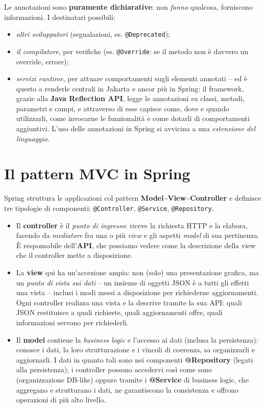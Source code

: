 \begin{importante}
Le annotazioni sono \textbf{puramente dichiarative}: non \emph{fanno} qualcosa, forniscono
informazioni. I destinatari possibili:
\begin{itemize}
  \item \emph{altri sviluppatori} (segnalazioni, es. \texttt{@Deprecated});
  \item \emph{il compilatore}, per verifiche (es. \texttt{@Override}: se il metodo non \`e
        davvero un override, errore);
  \item \emph{servizi runtime}, per attuare comportamenti sugli elementi annotati -- ed \`e
        questo a renderle centrali in Jakarta e ancor pi\`u in Spring: il framework, grazie
        alla \textbf{Java Reflection API}, legge le annotazioni su classi, metodi, parametri
        e campi, e attraverso di esse capisce come, dove e quando utilizzarli, come invocarne
        le funzionalit\`a e come dotarli di comportamenti aggiuntivi. L'uso delle annotazioni
        in Spring si avvicina a una \emph{estensione del linguaggio}.
\end{itemize}
\end{importante}

\section{Il pattern MVC in Spring}

Spring struttura le applicazioni col pattern \textbf{Model--View--Controller} e definisce tre
tipologie di componenti: \texttt{@Controller}, \texttt{@Service}, \texttt{@Repository}.
\begin{itemize}
  \item Il \textbf{controller} \`e il \emph{punto di ingresso}: riceve la richiesta HTTP e la
        elabora, facendo da \emph{mediatore} fra una o pi\`u \emph{view} e gli aspetti
        \emph{model} di sua pertinenza. \`E responsabile dell'\textbf{API}, che possiamo
        vedere come la descrizione della view che il controller mette a disposizione.
  \item La \textbf{view} qui ha un'accezione ampia: non (solo) una presentazione grafica, ma
        un \emph{punto di vista sui dati} -- un insieme di oggetti JSON \`e a tutti gli
        effetti una vista -- inclusi i modi messi a disposizione per richiederne
        aggiornamenti. Ogni controller realizza una vista e la descrive tramite la sua API:
        quali JSON restituisce a quali richieste, quali aggiornamenti offre, quali
        informazioni servono per richiederli.
  \item Il \textbf{model} contiene la \emph{business logic} e l'accesso ai dati (inclusa la
        persistenza): conosce i dati, la loro strutturazione e i vincoli di coerenza, sa
        organizzarli e aggiornarli. I dati in quanto tali sono nei componenti
        \textbf{@Repository} (legati alla persistenza); i controller possono accedervi
        cos\`i come sono (organizzazione DB-like) oppure tramite i \textbf{@Service} di
        business logic, che aggregano e strutturano i dati, ne garantiscono la consistenza e
        offrono operazioni di pi\`u alto livello.
\end{itemize}

